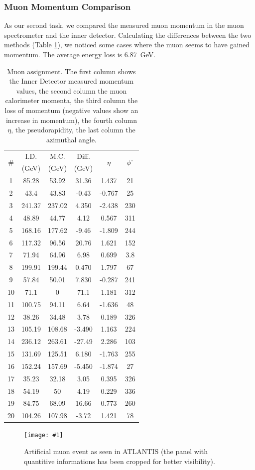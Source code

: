 \documentclass[twocolumn]{article}
\newcommand{\insertFigure}[1]{%
   \texttt{[image: \#1]}%
}
\begin{document}
\subsubsection{Muon Momentum Comparison}
As our second task, we compared the measured muon momentum in the muon spectrometer and the inner detector. Calculating the differences between the two methods (Table \ref{tab:muon}), we noticed some cases where the muon seems to have gained momentum. The average energy loss is 6.87~GeV.
\begin{table}
\centering
\begin{tabular}{|c|c|c|c|c|c|}
\hline
\multirow{2}{*}{\#} 	& I.D.		& M.C. 		& Diff. 	& \multirow{2}{*}{$\eta$} & \multirow{2}{*}{$\phi^{\circ}$}\\
					& (GeV)	& (GeV)	& (GeV)	&	&\\
\hline
1&	85.28&		53.92&		31.36&		1.437&	21\\\hline
2&	43.4&		43.83&		-0.43&		-0.767&	25\\\hline
3&	241.37&		237.02&		4.350&		-2.438&	230\\\hline
4&	48.89&		44.77&		4.12&		0.567&	311\\\hline
5&	168.16&		177.62&		-9.46&		-1.809&	244\\\hline
6&	117.32&		96.56&		20.76&		1.621&	152\\\hline
7&	71.94&		64.96&		6.98&		0.699&	3.8\\\hline
8&	199.91&		199.44&		0.470&		1.797&	67\\\hline
9&	57.84&		50.01&		7.830&		-0.287&	241\\\hline
10&	71.1&		0&			71.1&		1.181&	312\\\hline
11&	100.75&		94.11&		6.64&		-1.636&	48\\\hline
12&	38.26&		34.48&		3.78&		0.189&	326\\\hline
13&	105.19&		108.68&		-3.490&		1.163&	224\\\hline
14&	236.12&		263.61&		-27.49&		2.286&	103\\\hline
15&	131.69&		125.51&		6.180&		-1.763&	255\\\hline
16&	152.24&		157.69&		-5.450&		-1.874&	27\\\hline
17&	35.23&		32.18&		3.05&		0.395&	326\\\hline
18&	54.19&		50&			4.19&		0.229&	336\\\hline
19&	84.75&		68.09&		16.66&		0.773&	260\\\hline
20&	104.26&		107.98&		-3.72&		1.421&	78\\
\hline
\end{tabular}
\caption{Muon assignment. The first column shows the Inner Detector measured momentum values, the second column the muon calorimeter momenta, the third column the loss of momentum (negative values show an increase in momentum), the fourth column $\eta$, the pseudorapidity, the last column the azimuthal angle.}
\label{tab:muon}
\end{table}
\begin{figure}
\centering
\insertFigure{Images/Atlantis_Muon_cropped.png}
\caption{Artificial muon event as seen in ATLANTIS (the panel with quantitive informations has been cropped for better visibility).}
\end{figure}
\end{document}
